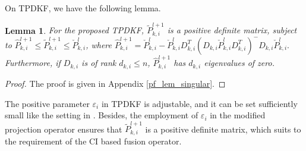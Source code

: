 \documentclass[journal,transmag]{IEEEtran}
\newtheorem{remark}{\textbf{Remark}}
\newtheorem{lemma}{\textbf{Lemma}}
\begin{document}
On 	TPDKF, we have the following lemma.
	\begin{lemma}\label{lem_singular}
		For the proposed TPDKF,   $\tilde P_{k,i}^{l+1}$ is a positive definite matrix, subject to $\hat P_{k,i}^{l+1}\leq\tilde P_{k,i}^{l+1}\leq\check P_{k,i}^{l}$,
		where $\hat P_{k,i}^{l+1}=\check P_{k,i}^l-\check P_{k,i}^lD_{k,i}^T(D_{k,i}\check P_{k,i}^lD_{k,i}^T)^{-}D_{k,i}\check P_{k,i}^l.$
Furthermore, if $D_{k,i}$ is of rank $d_{k,i}\leq n$, $\hat P_{k,i}^{l+1}$ has $d_{k,i}$ eigenvalues of zero.
	\end{lemma}
\begin{proof}
	The proof is given in Appendix \ref{pf_lem_singular}.
\end{proof}
	The positive parameter $\varepsilon_i$ in TPDKF is adjustable, and it can be set sufficiently small like the setting in \cite{Te2009state}. Besides, the employment of $\varepsilon_i$ in the modified projection operator ensures that $\tilde P_{k,i}^{l+1}$ is a positive definite matrix, which suits to the requirement of the CI based fusion operator.
	
\end{document}
